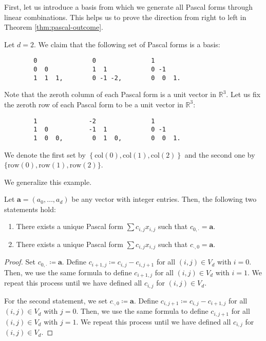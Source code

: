 First, let us introduce a basis from which we generate all Pascal forms through linear combinations. This helps us to prove the direction from right to left in Theorem \ref{thm:pascal-outcome}.

\begin{example}\label{ex:pascal-basis}
    Let \( d = 2 \). We claim that the following set of Pascal forms is a basis:
    \begin{verbatim}
        0               0               1               
        0  0            1  1            0 -1           
        1  1  1,        0 -1 -2,        0  0  1.     
    \end{verbatim}
    Note that the zeroth column of each Pascal form is a unit vector in \( \mathbb{R}^3 \). Let us fix the zeroth row of each Pascal form to be a unit vector in \( \mathbb{R}^3 \):
    \begin{verbatim}
        1              -2               1               
        1  0           -1  1            0 -1           
        1  0  0,        0  1  0,        0  0  1.
    \end{verbatim} 
    We denote the first set by \( \left\{ \mathrm{col}(0), \mathrm{col}(1), \mathrm{col}(2) \right\} \) and the second one by \( \{ \mathrm{row}(0), \mathrm{row}(1), \mathrm{row}(2) \} \).
\end{example}

We generalize this example.

\begin{proposition}\label{prop:supsup-pascal}
    Let \( \mathbf{a} = (a_0, \dots, a_d) \) be any vector with integer entries. Then, the following two statements hold:
    \begin{enumerate}
        \item There exists a unique Pascal form \( \sum c_{i,j}x_{i,j} \) such that \( c_{0,\cdot} = \mathbf a \).
        \item There exists a unique Pascal form \( \sum c_{i,j}x_{i,j} \) such that \( c_{\cdot,0} = \mathbf a \).
    \end{enumerate}
\end{proposition}

\begin{proof}
    Set \( c_{0,\cdot} \coloneqq \mathbf a \). Define \( c_{i+1,j} \coloneqq c_{i,j} - c_{i,j+1}\) for all \( (i,j) \in V_d \) with \( i=0 \). Then, we use the same formula to define \( c_{i+1,j} \) for all \( (i,j) \in V_d \) with \( i=1 \). We repeat this process until we have defined all \( c_{i,j} \) for \( (i,j) \in V_d \).

    For the second statement, we set \( c_{\cdot,0} \coloneqq \mathbf a \). Define \( c_{i,j+1} \coloneqq c_{i,j} - c_{i+1,j}\) for all \( (i,j) \in V_d \) with \( j=0 \). Then, we use the same formula to define \( c_{i,j+1} \) for all \( (i,j) \in V_d \) with \( j=1 \). We repeat this process until we have defined all \( c_{i,j} \) for \( (i,j) \in V_d \).
\end{proof}

